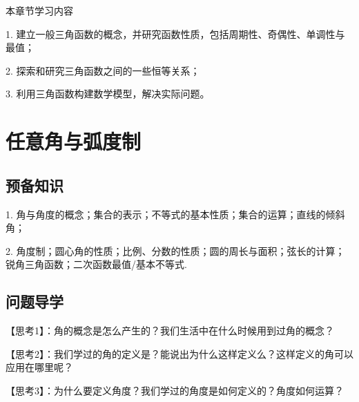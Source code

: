 \makefront
\vspace{-1.5em}
\startexercise
\hspace{-2.5em}
{\hei 本章节学习内容}\par
1. 建立一般三角函数的概念，并研究函数性质，包括周期性、奇偶性、单调性与最值；\par
2. 探索和研究三角函数之间的一些恒等关系；\par
3. 利用三角函数构建数学模型，解决实际问题。\par

\section{任意角与弧度制}
\subsection{预备知识}
1. 角与角度的概念；集合的表示；不等式的基本性质；集合的运算；直线的倾斜角；\par
2. 角度制；圆心角的性质；比例、分数的性质；圆的周长与面积；弦长的计算；锐角三角函数；二次函数最值/基本不等式.\par
\subsection{问题导学}
{\heiti 【思考1】}：角的概念是怎么产生的？我们生活中在什么时候用到过角的概念？\par
\vspace{6em}
{\heiti 【思考2】}：我们学过的角的定义是？能说出为什么这样定义么？这样定义的角可以应用在哪里呢？\par
\vspace{10em}
{\heiti 【思考3】}：为什么要定义角度？我们学过的角度是如何定义的？角度如何运算？\par
\vspace{10em}
